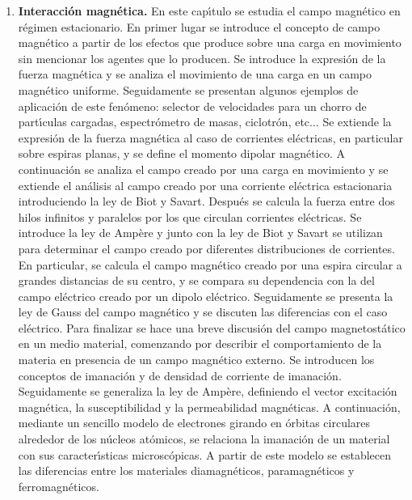 \begin{enumerate} [{\bf 1. }]
\item {\bf Interacci\'{o}n magn\'{e}tica.}
En este cap\'{\i}tulo se estudia el campo magn\'{e}tico en 
r\'{e}gimen estacionario. En primer lugar se introduce el concepto de 
campo magn\'{e}tico a partir de los efectos que produce sobre una carga
 en movimiento  sin mencionar los agentes que lo producen.
 Se introduce la expresi\'{o}n de la fuerza magn\'{e}tica y se analiza el 
movimiento de una carga en un campo magn\'{e}tico uniforme. 
Seguidamente se presentan algunos ejemplos de aplicaci\'{o}n de este fen\'{o}meno:
 selector de velocidades para un chorro de part\'{\i}culas cargadas,
 espectr\'{o}metro de masas, ciclotr\'{o}n, etc... 
Se extiende la expresi\'{o}n de la fuerza magn\'{e}tica al caso de corrientes
 el\'{e}ctricas, en particular sobre espiras planas, y se define el 
momento dipolar magn\'{e}tico. 
A continuaci\'{o}n se analiza el campo creado por una carga en movimiento
y se extiende el an\'{a}lisis al campo
 creado por una corriente el\'{e}ctrica estacionaria introduciendo
la ley de Biot y Savart. 
 Despu\'{e}s se calcula la fuerza entre dos hilos infinitos y paralelos por 
los que circulan corrientes el\'{e}ctricas.
Se introduce la ley de Amp\`{e}re y 
junto con la ley de Biot y Savart se utilizan
 para determinar el campo creado por diferentes 
distribuciones de corrientes. En particular, se calcula el campo magn\'{e}tico
 creado por una espira circular a grandes distancias de su centro, 
y se compara su dependencia con  la del campo el\'{e}ctrico
 creado por un dipolo el\'{e}ctrico. 
Seguidamente se presenta la ley de Gauss del campo magn\'{e}tico y se
 discuten las diferencias con el caso el\'{e}ctrico.
Para finalizar se hace una breve discusi\'{o}n del campo magnetost\'{a}tico 
en un medio material, comenzando por describir el comportamiento de la 
materia en presencia de un campo magn\'{e}tico externo. Se introducen los
 conceptos de imanaci\'{o}n y de densidad de corriente de imanaci\'{o}n.
 Seguidamente se generaliza la ley de Amp\`{e}re, definiendo el vector
 excitaci\'{o}n magn\'{e}tica, la susceptibilidad y la permeabilidad
 magn\'{e}ticas. A continuaci\'{o}n, mediante un sencillo modelo de electrones 
girando en \'{o}rbitas circulares alrededor de los n\'{u}cleos at\'{o}micos, 
se relaciona la imanaci\'{o}n de un material con sus caracter\'{\i}sticas
microsc\'{o}picas. A partir de este modelo se establecen las diferencias entre 
los materiales diamagn\'{e}ticos, paramagn\'{e}ticos y ferromagn\'{e}ticos.



\end{enumerate}
